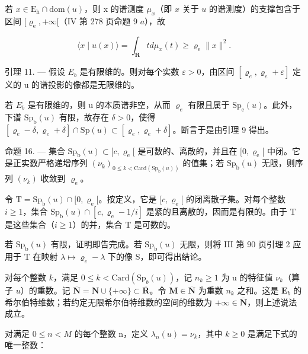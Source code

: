 若 \(x \in \mathrm{E}_{\mathrm{h}} \cap \mathrm{dom}(u)\)，则 x 的谱测度 \(\mu_{x}\)（即 \(x\) 关于 \(u\) 的谱测度）的支撑包含于区间 \([\varrho_{\mathrm{e}}, +\infty[\)（IV 第 278 页命题 9 \(a\)），故

\[
\langle x \mid u (x) \rangle = \int_ {\mathbf {R}} t d \mu_ {x} (t) \geqslant \varrho_ {\mathrm{e}} \| x \| ^ {2}.
\]

引理 11. --- 假设 \(E_{b}\) 是有限维的。则对每个实数 \(\varepsilon > 0\)，由区间 \([\varrho_{e}, \varrho_{e} + \varepsilon]\) 定义的 u 的谱投影的像都是无限维的。

若 \(E_{b}\) 是有限维的，则 u 的本质谱非空，从而 \(\varrho_{e}\) 有限且属于 \(\mathrm{Sp}_{\mathrm{e}}(u)\)。此外，下谱 \(\mathrm{Sp}_{\mathrm{b}}(u)\) 有限，故存在 \(\delta > 0\)，使得 \([\varrho_{e} - \delta, \varrho_{e} + \delta] \cap \mathrm{Sp}(u) \subset [\varrho_{e}, \varrho_{e} + \delta]\)。断言于是由引理 9 得出。

命题 16. --- 集合 \(\mathrm{Sp}_{\mathrm{b}}(u) \subset [c, \varrho_{\mathrm{e}}[\) 是可数的、离散的，并且在 \([0, \varrho_{\mathrm{e}}[\) 中闭。它是正实数严格递增序列 \((\nu_{k})_{0 \leqslant k < \mathrm{Card}(\mathrm{Sp}_{\mathrm{b}}(u))}\) 的值集；若 \(\mathrm{Sp}_{\mathrm{b}}(u)\) 无限，则序列 \((\nu_{k})\) 收敛到 \(\varrho_{\mathrm{e}}\)。

令 \(\mathrm{T} = \mathrm{Sp}_{\mathrm{b}}(u) \cap [0, \varrho_{\mathrm{e}}[\)。按定义，它是 \([c, \varrho_{\mathrm{e}}[\) 的闭离散子集。对每个整数 \(i \geqslant 1\)，集合 \(\mathrm{Sp}_{\mathrm{b}}(u) \cap [c, \varrho_{\mathrm{e}} - 1/i]\) 是紧的且离散的，因而是有限的。由于 T 是这些集合（\(i \geqslant 1\)）的并，集合 T 是可数的。

若 \(\mathrm{Sp}_{\mathrm{b}}(u)\) 有限，证明即告完成。若 \(\mathrm{Sp}_{\mathrm{b}}(u)\) 无限，则将 III 第 90 页引理 2 应用于 T 在映射 \(\lambda \mapsto \varrho_{e} - \lambda\) 下的像 S，即可得出结论。

对每个整数 \(k\)，满足 \(0 \leqslant k < \text{Card}(\text{Sp}_b(u))\)，记 \(n_k \geqslant 1\) 为 u 的特征值 \(\nu_k\)（算子 \(u\)）的重数。记 \(\overline{\mathbf{N}} = \mathbf{N} \cup \{+\infty\} \subset \overline{\mathbf{R}}\)。令 \(\mathbf{M} \in \overline{\mathbf{N}}\) 为重数 \(n_k\) 之和。这是 \(\mathbf{E}_b\) 的希尔伯特维数；若约定无限希尔伯特维数的空间的维数为 \(+\infty \in \overline{\mathbf{N}}\)，则上述说法成立。

对满足 \(0 \leqslant n < M\) 的每个整数 n，定义 \(\lambda_{n}(u) = \nu_{k}\)，其中 \(k \geqslant 0\) 是满足下式的唯一整数：

